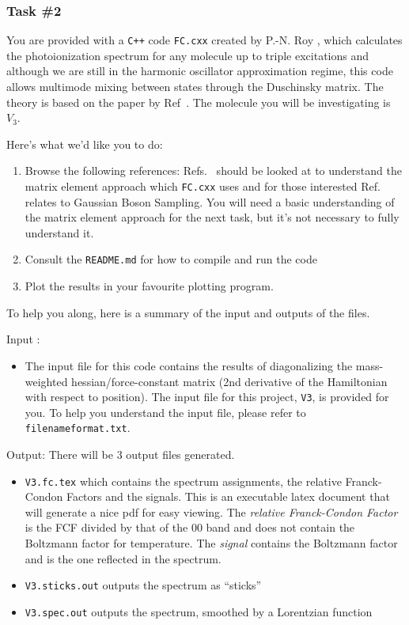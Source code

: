 \documentclass[12pt]{article}
\begin{document}
\subsubsection*{Task \#2}

You are provided with a \texttt{C++} code \texttt{FC.cxx} created by P.-N. Roy \cite{yang1995structure}, which calculates the photoionization spectrum for any molecule up to triple excitations and although we are still in the harmonic oscillator approximation regime, this code allows multimode mixing between states through the Duschinsky matrix. The theory is based on the paper by Ref~\cite{doktorov1977dynamical}. The molecule you will be investigating is $V_3$.

Here's what we'd like you to do:
\begin{enumerate}
    \item Browse the following references: Refs.~\cite{yang1995structure,jankowiak2007vibronic} should be looked at to understand the matrix element approach which \texttt{FC.cxx} uses and for those interested Ref.~\cite{quesadaFranckCondonFactorsCounting2019} relates to Gaussian Boson Sampling. You will need a basic understanding of the matrix element approach for the next task, but it's not necessary to fully understand it.
    \item Consult the \texttt{README.md} for how to compile and run the code
     \item Plot the results in your favourite plotting program. 
\end{enumerate}
To help you along, here is a summary of the input and outputs of the files.

\noindent Input :
\begin{itemize}
\item  The input file for this code contains the results of diagonalizing the mass-weighted hessian/force-constant matrix (2nd derivative of the Hamiltonian with respect to position). The input file for this project, \texttt{V3}, is provided for you. To help you understand the input file, please refer to \texttt{filenameformat.txt}. 
\end{itemize}

\noindent Output: There will be 3 output files generated. 
\begin{itemize}
\item  \texttt{V3.fc.tex} which contains the spectrum assignments, the relative Franck-Condon Factors and the signals. This is an executable latex document that will generate a nice pdf for easy viewing. The  {\it relative Franck-Condon Factor} is the FCF divided by that of the 00 band and does not contain the Boltzmann factor for temperature. The {\it signal} contains the Boltzmann factor and is the one reflected in the spectrum. 
\item \texttt{V3.sticks.out} outputs the spectrum as ``sticks''
\item \texttt{V3.spec.out} outputs the spectrum, smoothed by a Lorentzian function  
\end{itemize}
\end{document}

